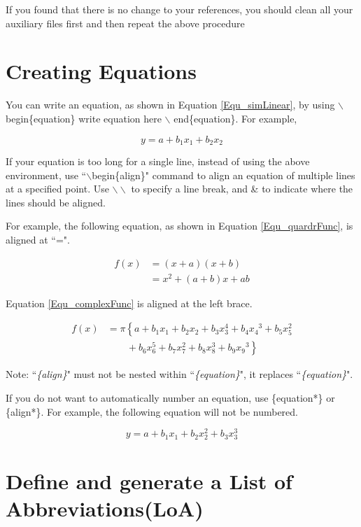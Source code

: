 If you found that there is no change to your references, you should clean all your auxiliary files first and then repeat the above procedure


\section{Creating Equations}

You can write an equation, as shown in Equation \ref{Equ_simLinear}, by using $\backslash$begin\{equation\} write equation here $\backslash$ end\{equation\}. For example, 

\begin{equation}
\label{Equ_simLinear}
y = a + b_1x_1 + b_2x_2
\end{equation}

If your equation is too long for a single line, instead of using the above environment,  
use ``$\backslash$begin\{align\}" command to align an equation of multiple lines at a specified point. 
Use $\backslash\backslash$ to specify a line break, and \& to indicate where  the lines should be aligned. 

For example, the following equation, as shown in Equation \ref{Equ_quardrFunc}, is aligned at ``=". 

\begin{align}
\label{Equ_quardrFunc}
f(x) &= (x+a)(x+b) \nonumber \\
&= x^2 + (a+b)x + ab
\end{align}

Equation \ref{Equ_complexFunc} is aligned at the left brace.  

\begin{align}
\label{Equ_complexFunc}
f(x) &= \pi \left\{ a + b_1x_1 + b_2x_2+ b_3x_3^4 + b_4{x_4}^3 + b_5x_5^2 \right.\nonumber\\
&\qquad \left. {} + b_6x_6^5 + b_7x_7^2+ b_8x_8^3 + b_9{x_9}^3 \right\}
\end{align}  

Note: ``\emph{\{align\}}" must not be nested within ``\emph{\{equation\}}", it replaces ``\emph{\{equation\}}".

If you do not want to automatically number an equation, use  \{equation*\} or  \{align*\}. For example, the following equation will not be numbered.   

\begin{equation*}
y = a + b_1x_1 + b_2x_2^2 + b_3x_3^3
\end{equation*}

\section{Define and generate a List of Abbreviations(LoA)}
\label{Sec_Abbr}

